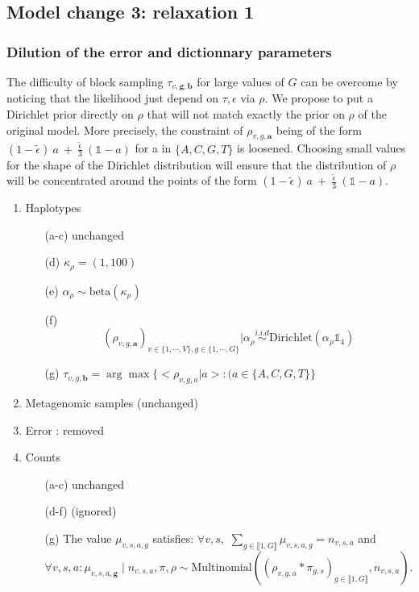 \documentclass{article}
\newcommand\shape\kappa
\newcommand\indexvec[1]{\mathbf{#1}}
\begin{document}
\subsection{Model change 3: relaxation 1}
\subsubsection{Dilution of the error and dictionnary parameters}

The difficulty of block sampling $\tau_{v,\indexvec{g},\indexvec{b}}$ for large values of $G$ can be overcome by noticing that the likelihood just depend on $\tau,\epsilon$ via
$\rho$. We propose to put a Dirichlet prior directly on $\rho$ that will not match exactly the prior on $\rho$ of the original model. More precisely, the constraint of $\rho_{v,g,\indexvec{a}}$ being of the form $(1-\tilde\epsilon)~a~+~ \frac{\tilde\epsilon}3~(\mathds{1}-a)$ for a in $\{A,C,G,T\}$ is loosened. Choosing small values for the shape of the Dirichlet distribution will ensure that the distribution of $\rho$ will be concentrated around the points of the form $(1-\tilde\epsilon)~a~+~ \frac{\tilde\epsilon}3~(\mathds{1}-a)$.
\begin{enumerate}[1.]
    \item Haplotypes
    \begin{enumerate}
    \item[(a-c)] unchanged
    \item[(d)] ${\shape}_{\rho}=(1,100)$
    \item[(e)] $\alpha_{\rho}\sim\mathrm{beta}\left({\shape}_{\rho}\right)$
    \item[(f)] $$\left(\rho_{v,g,\indexvec{a}}\right)_{v\in\{1,\cdots,V\},g\in\{1,\cdots,G\}}|\alpha_{\rho}\overset{i.i.d }{\sim}\mathrm{Dirichlet}(\alpha_{\rho}\mathds{1}_4)$$
    \item[(g)] 
    $\tau_{v,g,\indexvec{b}}=\arg\max\{ <\rho_{v,g,a}|a>:(a\in\{A,C,G,T\}\}$

    \end{enumerate}
    \item Metagenomic samples (unchanged)
    \item Error : removed
    \item Counts
    \begin{enumerate}

\item[(a-c)] unchanged
    \item [(d-f)] (ignored)
     \item[(g)] The value $\mu_{v,s,a,g}$ satisfies: $\forall v,s,$  $\sum_{g\in\llbracket 1,G\rrbracket}\mu_{v,s,a,g}=n_{v,s,a}$ and
    $$\forall v,s,a : \mu_{v,s,a,\indexvec{g}} \mid n_{v,s,a},\pi, \rho \sim \mathrm{Multinomial}\left(\left(\rho_{v,g,a}*\pi_{g,s}\right)_{g\in\llbracket 1,G\rrbracket},n_{v,s,a}\right).$$
    

\end{enumerate}
\end{enumerate}
\end{document}
